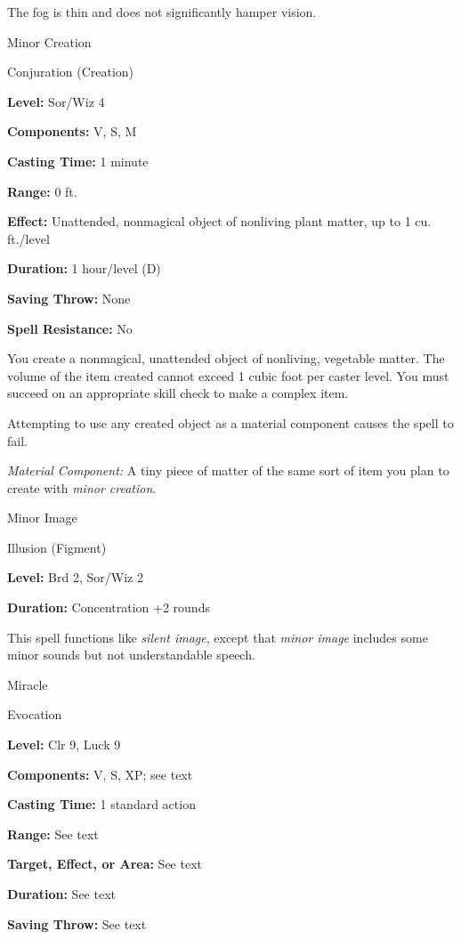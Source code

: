\documentclass{article}
\begin{document}
The fog is thin and does not significantly hamper vision.

\vspace{12pt}
Minor Creation

Conjuration (Creation)

\textbf{Level:} Sor/Wiz 4

\textbf{Components:} V, S, M

\textbf{Casting Time:} 1 minute

\textbf{Range:} 0 ft.

\textbf{Effect:} Unattended, nonmagical object of nonliving plant matter, up to 
1 cu. ft./level

\textbf{Duration:} 1 hour/level (D)

\textbf{Saving Throw:} None

\textbf{Spell Resistance:} No

You create a nonmagical, unattended object of nonliving, vegetable matter. The 
volume of the item created cannot exceed 1 cubic foot per caster level. You must 
succeed on an appropriate skill check to make a complex item.

Attempting to use any created object as a material component causes the spell to 
fail.

\textit{Material Component: }A tiny piece of matter of the same sort of item you 
plan to create with \textit{minor creation}.

\vspace{12pt}
Minor Image

Illusion (Figment)

\textbf{Level:} Brd 2, Sor/Wiz 2

\textbf{Duration:} Concentration +2 rounds

This spell functions like \textit{silent image}, except that \textit{minor image 
}includes some minor sounds but not understandable speech.

\vspace{12pt}
Miracle

Evocation

\textbf{Level:} Clr 9, Luck 9

\textbf{Components:} V, S, XP; see text

\textbf{Casting Time:} 1 standard action

\textbf{Range:} See text

\textbf{Target, Effect, or Area: }See text

\textbf{Duration:} See text

\textbf{Saving Throw:} See text
\end{document}
